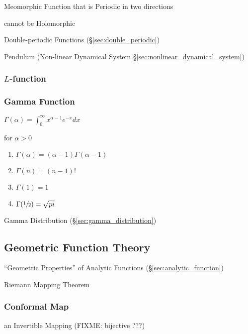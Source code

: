 Meomorphic Function that is Periodic in two directions

cannot be Holomorphic

Double-periodic Functions (\S\ref{sec:double_periodic})

Pendulum (Non-linear Dynamical System \S\ref{sec:nonlinear_dynamical_system})



\subsubsection{$L$-function}\label{sec:l_function}

\subsubsection{Gamma Function}\label{sec:gamma_function}

$\Gamma(\alpha) = \int_0^{\infty} x^{\alpha -1} e^{-x} dx$

for $\alpha > 0$

\begin{enumerate}
\item $\Gamma(\alpha) = (\alpha - 1) \Gamma(\alpha -1)$
\item $\Gamma(n) = (n-1)!$
\item $\Gamma(1) = 1$
\item $\Gamma(\sfrac{1}{2}) = \sqrt{pi}$
\end{enumerate}

Gamma Distribution (\S\ref{sec:gamma_distribution})



\subsection{Geometric Function Theory}\label{sec:geometric_function_theory}

``Geometric Properties'' of Analytic Functions (\S\ref{sec:analytic_function})

Riemann Mapping Theorem



\subsubsection{Conformal Map}\label{sec:conformal_map}

an Invertible Mapping (FIXME: bijective ???)

